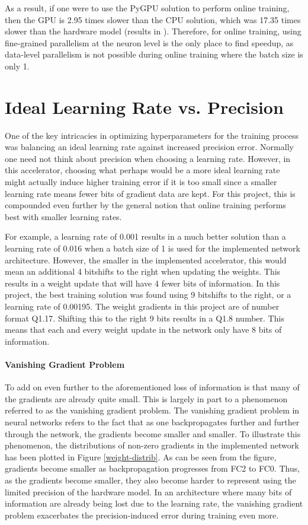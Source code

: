 As a result, if one were to use the PyGPU solution to perform online training, then the GPU is 2.95 times slower than the CPU solution, which was 17.35 times slower than the hardware model (results in \cite[inline]{Experiment results appendix}). Therefore, for online training, using fine-grained parallelism at the neuron level is the only place to find speedup, as data-level parallelism is not possible during online training where the batch size is only 1.

\section{Ideal Learning Rate vs. Precision}
One of the key intricacies in optimizing hyperparameters for the training process was balancing an ideal learning rate against increased precision error. Normally one need not think about precision when choosing a learning rate. However, in this accelerator, choosing what perhaps would be a more ideal learning rate might actually induce higher training error if it is too small since a smaller learning rate means fewer bits of gradient data are kept. For this project, this is compounded even further by the general notion that online training performs best with smaller learning rates. 

For example, a learning rate of 0.001 results in a much better solution than a learning rate of 0.016 when a batch size of 1 is used for the implemented network architecture. However, the smaller in the implemented accelerator, this would mean an additional 4 bitshifts to the right when updating the weights. This results in a weight update that will have 4 fewer bits of information. In this project, the best training solution was found using 9 bitshifts to the right, or a learning rate of 0.00195. The weight gradients in this project are of number format Q1.17. Shifting this to the right 9 bits results in a Q1.8 number. This means that each and every weight update in the network only have 8 bits of information.

\paragraph{Vanishing Gradient Problem}
To add on even further to the aforementioned loss of information is that many of the gradients are already quite small. This is largely in part to a phenomenon referred to as the vanishing gradient problem. The vanishing gradient problem in neural networks refers to the fact that as one backpropagates further and further through the network, the gradients become smaller and smaller. To illustrate this phenomenon, the distributions of non-zero gradients in the implemented network has been plotted in Figure \ref{weight-distrib}. As can be seen from the figure, gradients become smaller as backpropagation progresses from FC2 to FC0. Thus, as the gradients become smaller, they also become harder to represent using the limited precision of the hardware model. In an architecture where many bits of information are already being lost due to the learning rate, the vanishing gradient problem exacerbates the precision-induced error during training even more.

